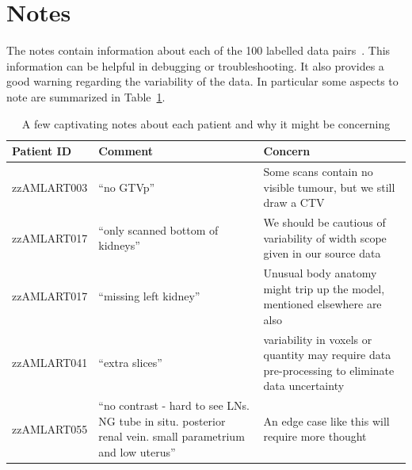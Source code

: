 \documentclass[11pt,twoside]{report}
\begin{document}
\section{Notes}\label{sec:data-notes}

The notes contain information about each of the 100 labelled data pairs~\cite{AMLART-data}. This information can be helpful in debugging or troubleshooting. It also provides a good warning regarding the variability of the data. In particular some aspects to note are summarized in Table~\ref{tab:notes-summary}.

\begin{table}[ht]
  \centering
  \begin{tabular}{>{\raggedright}p{3cm}p{6cm}p{6cm}}
    \toprule
    \textbf{Patient ID} & \textbf{Comment}                                                                                           & \textbf{Concern}                                                                                \\
    \midrule
    zzAMLART003         & ``no GTVp''                                                                                                & Some scans contain no visible tumour, but we still draw a CTV                                   \\
    \midrule
    zzAMLART017         & ``only scanned bottom of kidneys''                                                                         & We should be cautious of variability of width scope given in our source data                    \\
    \midrule
    zzAMLART017         & ``missing left kidney''                                                                                    & Unusual body anatomy might trip up the model, mentioned elsewhere are also                      \\
    \midrule
    zzAMLART041         & ``extra slices''                                                                                           & variability in voxels or quantity may require data pre-processing to eliminate data uncertainty \\
    \midrule
    zzAMLART055         & ``no contrast - hard to see LNs. NG tube in situ. posterior renal vein. small parametrium and low uterus'' & An edge case like this will require more thought                                                \\
    \bottomrule
  \end{tabular}
  \caption{A few captivating notes about each patient and why it might be concerning}
  \label{tab:notes-summary}
\end{table}
\end{document}
